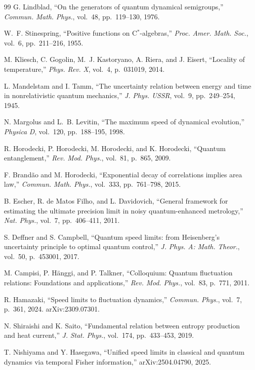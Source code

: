 \documentclass[10pt]{article}
\begin{document}
\begin{thebibliography}{99}
G. Lindblad, 
“On the generators of quantum dynamical semigroups,” 
\emph{Commun. Math. Phys.}, vol.~48, pp.~119–130, 1976.

W.~F. Stinespring, 
“Positive functions on C$^*$-algebras,” 
\emph{Proc. Amer. Math. Soc.}, vol.~6, pp.~211–216, 1955.

M. Kliesch, C. Gogolin, M.~J. Kastoryano, A. Riera, and J. Eisert, 
“Locality of temperature,” 
\emph{Phys. Rev. X}, vol.~4, p.~031019, 2014.

L. Mandelstam and I. Tamm, 
“The uncertainty relation between energy and time in nonrelativistic quantum mechanics,” 
\emph{J. Phys. USSR}, vol.~9, pp.~249–254, 1945.

N. Margolus and L.~B. Levitin, 
“The maximum speed of dynamical evolution,” 
\emph{Physica D}, vol.~120, pp.~188–195, 1998.

R. Horodecki, P. Horodecki, M. Horodecki, and K. Horodecki, 
“Quantum entanglement,” 
\emph{Rev. Mod. Phys.}, vol.~81, p.~865, 2009.

F. Brandão and M. Horodecki, 
“Exponential decay of correlations implies area law,” 
\emph{Commun. Math. Phys.}, vol.~333, pp.~761–798, 2015.

B. Escher, R. de Matos Filho, and L. Davidovich, 
“General framework for estimating the ultimate precision limit in noisy quantum-enhanced metrology,” 
\emph{Nat. Phys.}, vol.~7, pp.~406–411, 2011.

S. Deffner and S. Campbell, 
“Quantum speed limits: from Heisenberg’s uncertainty principle to optimal quantum control,” 
\emph{J. Phys. A: Math. Theor.}, vol.~50, p.~453001, 2017.

M. Campisi, P. Hänggi, and P. Talkner, 
“Colloquium: Quantum fluctuation relations: Foundations and applications,” 
\emph{Rev. Mod. Phys.}, vol.~83, p.~771, 2011.

R. Hamazaki, 
“Speed limits to fluctuation dynamics,” 
\emph{Commun. Phys.}, vol.~7, p.~361, 2024. arXiv:2309.07301.

N. Shiraishi and K. Saito, 
“Fundamental relation between entropy production and heat current,” 
\emph{J. Stat. Phys.}, vol.~174, pp.~433–453, 2019.

T. Nishiyama and Y. Hasegawa, 
“Unified speed limits in classical and quantum dynamics via temporal Fisher information,” 
arXiv:2504.04790, 2025.


\end{thebibliography}
\end{document}
